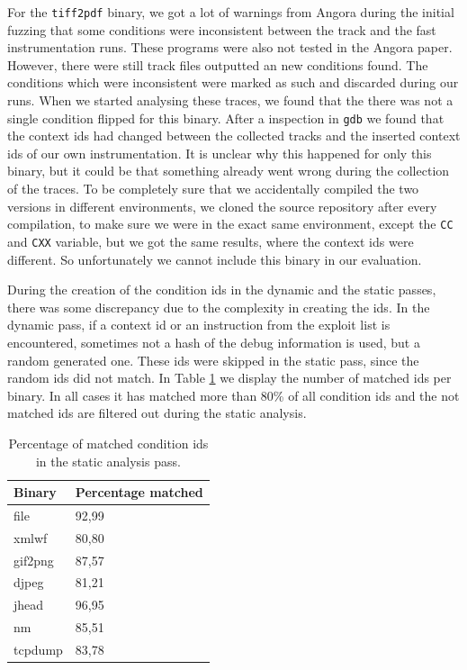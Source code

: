 For the \texttt{tiff2pdf} binary, we got a lot of warnings from Angora during the initial fuzzing that some conditions were inconsistent between the track and the fast instrumentation runs. These programs were also not tested in the Angora paper. However, there were still track files outputted an new conditions found. The conditions which were inconsistent were marked as such and discarded during our runs. When we started analysing these traces, we found that the there was not a single condition flipped for this binary. After a inspection in \texttt{gdb} we found that the context ids had changed between the collected tracks and the inserted context ids of our own instrumentation. It is unclear why this happened for only this binary, but it could be that something already went wrong during the collection of the traces. To be completely sure that we accidentally compiled the two versions in different environments, we cloned the source repository after every compilation, to make sure we were in the exact same environment, except the \texttt{CC} and \texttt{CXX} variable, but we got the same results, where the context ids were different. 
So unfortunately we cannot include this binary in our evaluation.

During the creation of the condition ids in the dynamic and the static passes, there was some discrepancy due to the complexity in creating the ids. In the dynamic pass, if a context id or an instruction from the exploit list is encountered, sometimes not a hash of the debug information is used, but a random generated one. These ids were skipped in the static pass, since the random ids did not match. In Table \ref{tab:matchedIds} we display the number of matched ids per binary. In all cases it has matched more than 80\% of all condition ids and the not matched ids are filtered out during the static analysis.
\begin{table}[H]
\centering
\begin{tabular}{l|l}
\textbf{Binary} & \textbf{Percentage matched} \\\hline
file            & 92,99                      \\
xmlwf           & 80,80                      \\
gif2png         & 87,57                       \\
djpeg           & 81,21                       \\
jhead           & 96,95                       \\
nm              & 85,51    
      \\
tcpdump              & 83,78   
\end{tabular}
\caption{Percentage of matched condition ids in the static analysis pass.}\label{tab:matchedIds}
\end{table}

